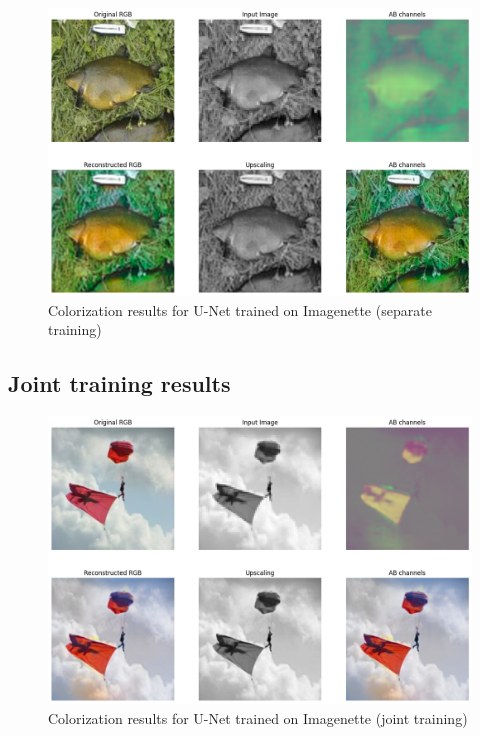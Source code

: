 \documentclass[aspectratio=169]{beamer}
\theoremstyle{definition}
\begin{document}
\begin{frame}
    \begin{figure}
        \centering
        \includegraphics[width=.75\textwidth]{demo-pipeline/fish2.png}
        \caption{Colorization results for U-Net trained on Imagenette (separate training)}
    \end{figure}
\end{frame}

\subsection{Joint training results}
\begin{frame}
    \tableofcontents[currentsubsection]
\end{frame}

\begin{frame}
    \begin{figure}
        \centering
        \includegraphics[width=.75\textwidth]{demo-both/deltaplane.png}
        \caption{Colorization results for U-Net trained on Imagenette (joint training)}
    \end{figure}
\end{frame}
\end{document}
